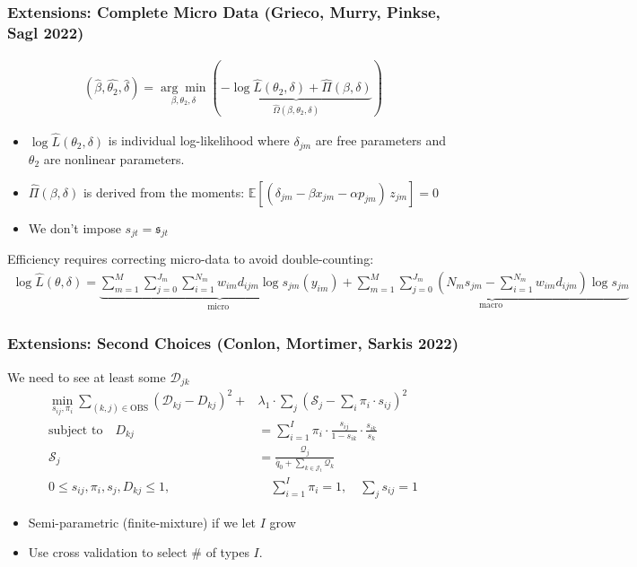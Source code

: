 \documentclass[xcolor=pdftex,dvipsnames,table,mathserif,aspectratio=169]{beamer}
\newcommand{\norm}[1]{\left\lVert#1\right\rVert}
\begin{document}
\begin{frame} \frametitle{Extensions: Complete Micro Data (Grieco, Murry, Pinkse, Sagl 2022)}
\footnotesize
\begin{align*}
(\hat{\beta}, \hat{\theta_2}, \hat{\delta})=\underset{\beta, \theta_2, \delta}{\arg \min }(\underbrace{-\log \hat{L}(\theta_2, \delta)+\hat{\Pi}(\beta, \delta)}_{\hat{\Omega}(\beta, \theta_2, \delta)})
\end{align*}
\begin{itemize}
\item $\log \hat{L}(\theta_2, \delta)$ is individual log-likelihood where $\delta_{jm}$ are free parameters and $\theta_2$ are nonlinear parameters.
\item $\hat{\Pi}(\beta,\delta)$ is derived from the moments: $\mathbb{E}[\left(\delta_{jm}-\beta x_{jm} - \alpha p_{jm}\right)\, z_{jm}]=0$
\item We don't impose $s_{jt} = \mathfrak{s}_{jt}$
\end{itemize}
Efficiency requires correcting micro-data to avoid double-counting:
\begin{align*}
\log \hat{L}(\theta, \delta)=\underbrace{\sum_{m=1}^M \sum_{j=0}^{J_m} \sum_{i=1}^{N_m} w_{i m} d_{i j m} \log s_{j m}(y_{i m})}_{\text {micro }}+\underbrace{\sum_{m=1}^M \sum_{j=0}^{J_m}\left(N_m s_{j m}-\sum_{i=1}^{N_m} w_{i m} d_{i j m}\right) \log s_{j m}}_{\text {macro }}
\end{align*}
\end{frame}

\begin{frame} \frametitle{Extensions: Second Choices (Conlon, Mortimer, Sarkis 2022)}
\small
We need to see at least some $\mathcal{D}_{jk}$
\begin{align*}
\min_{s_{ij}, \pi_i}\sum_{(k,j) \in \text{OBS}} \left( \mathcal{D}_{kj} - D_{kj}\right)^2+ & \lambda_1 \cdot  \sum_j \left(\mathcal{S}_j - \sum_i \pi_i \cdot s_{ij} \right)^2\\ %
\text{subject to} \quad 
\nonumber    D_{kj} &= \sum_{i=1}^I \pi_i \cdot \frac{s_{ij}}{1-s_{ik}} \cdot \frac{s_{ik}}{s_{k}}\\
\nonumber    \mathcal{S}_j &= \frac{\mathcal{Q}_j }{\overline{q}_0 +\sum_{k \in \mathcal{J}_t} \mathcal{Q}_k}  \\
\nonumber   0\leq s_{ij}, \pi_i, s_j, D_{kj} \leq 1,& \quad
   \sum_{i=1}^I \pi_i = 1,\quad
   \sum_j s_{ij} = 1 
\end{align*}
\vspace{-.25cm}
\begin{itemize} 
  \item Semi-parametric (finite-mixture) if we let $I$ grow
\item Use cross validation to select \# of types $I$.
\end{itemize}
\end{frame}
\end{document}

